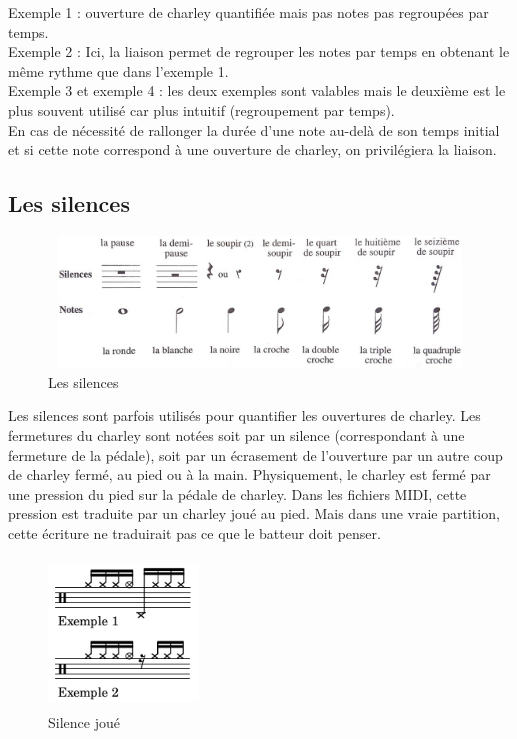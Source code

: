 Exemple 1 : ouverture de charley quantifiée mais pas notes pas regroupées par temps.\\
Exemple 2 : Ici, la liaison permet de regrouper les notes par temps en obtenant le même rythme que dans l’exemple 1.\\
Exemple 3 et exemple 4 : les deux exemples sont valables mais le deuxième est le plus souvent utilisé car plus intuitif (regroupement par temps).\\
En cas de nécessité de rallonger la durée d’une note au-delà de son temps initial et si cette note correspond à une ouverture de charley, on privilégiera la liaison.
\subsection*{Les silences}
\begin{figure}[h]
	\centering
	\includegraphics[height=35mm, width=120mm]{z_images/3_methodes/0_notation_de_la_batterie/4_silences.png}
	\caption{Les silences}
	\label{silences}
\end{figure}\newpage
Les silences sont parfois utilisés pour quantifier les ouvertures de charley. Les fermetures du charley sont notées soit par un silence (correspondant à une fermeture de la pédale), soit par un écrasement de l’ouverture par un autre coup de charley fermé, au pied ou à la main.
Physiquement, le charley est fermé par une pression du pied sur la pédale de charley. Dans les fichiers MIDI, cette pression est traduite par un charley joué au pied. Mais dans une vraie partition, cette écriture ne traduirait pas ce que le batteur doit penser.
\begin{figure}[h]
	\centering
	\includegraphics[height=40mm, width=40mm]{z_images/3_methodes/0_notation_de_la_batterie/5_silence_joue.png}
	\caption{Silence joué}
	\label{silence joue}
\end{figure}\\
